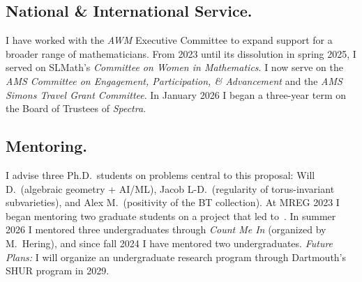 \documentclass[11pt,reqno]{amsart}
\theoremstyle{remark}
\begin{document}
\subsection{National \& International Service.} I have worked with the \textit{AWM} Executive Committee to expand support for a broader range of mathematicians. From 2023 until its dissolution in spring 2025, I served on SLMath's \textit{Committee on Women in Mathematics}. I now serve on the \textit{AMS Committee on Engagement, Participation, \& Advancement} and the \textit{AMS Simons Travel Grant Committee}. In January 2026 I began a three-year term on the Board of Trustees of \textit{Spectra}.

\subsection{Mentoring.} I advise three Ph.D.\ students on problems central to this proposal: Will D.\ (algebraic geometry + AI/ML), Jacob L-D.\ (regularity of torus-invariant subvarieties), and Alex M.\ (positivity of the BT collection). At MREG 2023 I began mentoring two graduate students on a project that led to~\cite{BBZ26}. In summer 2026 I mentored three undergraduates through \textit{Count Me In} (organized by M.~Hering), and since fall 2024 I have mentored two undergraduates. \emph{Future Plans:} I will organize an undergraduate research program through Dartmouth's SHUR program in 2029.

\newpage
\renewcommand{\bibliofont}{\normalsize}


\end{document}
